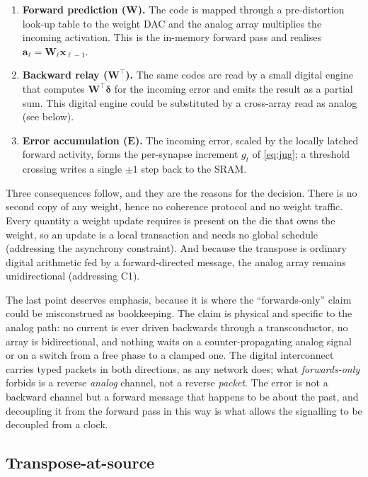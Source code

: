 \documentclass[11pt]{article}
\begin{document}
\begin{enumerate}
\def\labelenumi{\arabic{enumi}.}
\item
  \textbf{Forward prediction (\(\bm W\)).} The code is mapped through a
  pre-distortion look-up table to the weight DAC and the analog array
  multiplies the incoming activation. This is the in-memory forward pass
  and realises \(\bm a_\ell = \bm W_\ell \bm x_{\ell-1}\).
\item
  \textbf{Backward relay (\(\bm W^{\!\top}\)).} The same codes are read
  by a small digital engine that computes \(\bm W^{\!\top}\bm\delta\)
  for the incoming error and emits the result as a partial sum. This
  digital engine could be substituted by a cross-array read as analog
  (see below).
\item
  \textbf{Error accumulation (\(\bm E\)).} The incoming error, scaled by
  the locally latched forward activity, forms the per-synapse increment
  \(g_t\) of \eqref{eq:jug}; a threshold crossing writes a single \(\pm1\) step
  back to the SRAM.
\end{enumerate}

Three consequences follow, and they are the reasons for the decision.
There is no second copy of any weight, hence no coherence protocol and
no weight traffic. Every quantity a weight update requires is present on
the die that owns the weight, so an update is a local transaction and
needs no global schedule (addressing the asynchrony constraint). And
because the transpose is ordinary digital arithmetic fed by a
forward-directed message, the analog array remains unidirectional
(addressing C1).

The last point deserves emphasis, because it is where the
``forwards-only'' claim could be misconstrued as bookkeeping. The claim
is physical and specific to the analog path: no current is ever driven
backwards through a transconductor, no array is bidirectional, and
nothing waits on a counter-propagating analog signal or on a switch from
a free phase to a clamped one. The digital interconnect carries typed
packets in both directions, as any network does; what
\emph{forwards-only} forbids is a reverse \emph{analog} channel, not a
reverse \emph{packet}. The error is not a backward channel but a forward
message that happens to be about the past, and decoupling it from the
forward pass in this way is what allows the signalling to be decoupled
from a clock.

\hypertarget{sec:transpose}{%
\subsection{Transpose-at-source}\label{sec:transpose}}
\end{document}

